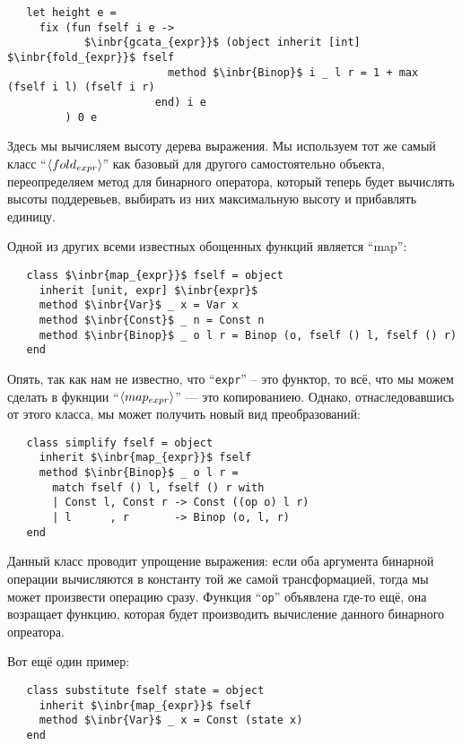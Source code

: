 \begin{lstlisting}
   let height e =
     fix (fun fself i e ->
            $\inbr{gcata_{expr}}$ (object inherit [int] $\inbr{fold_{expr}}$ fself
                         method $\inbr{Binop}$ i _ l r = 1 + max (fself i l) (fself i r) 
                       end) i e
         ) 0 e
\end{lstlisting}

Здесь мы вычисляем высоту дерева выражения. Мы используем тот же самый класс ``$\left<fold_{expr}\right>$'' как базовый для другого самостоятельно объекта, переопределяем метод для бинарного оператора, который теперь будет вычислять высоты поддеревьев, выбирать из них максимальную высоту и прибавлять единицу.

Одной из других всеми известных обощенных функций является ``map'':

\begin{lstlisting}
   class $\inbr{map_{expr}}$ fself = object 
     inherit [unit, expr] $\inbr{expr}$
     method $\inbr{Var}$ _ x = Var x
     method $\inbr{Const}$ _ n = Const n
     method $\inbr{Binop}$ _ o l r = Binop (o, fself () l, fself () r)
   end
\end{lstlisting}

Опять, так как нам не известно, что ``\lstinline{expr}'' -- это функтор, то всё, что мы можем сделать в фукнции ``$\left<map_{expr}\right>$'' --- 
это копированиею. Однако, отнаследовавшись от этого класса, мы может получить новый вид преобразований:

\begin{lstlisting}
   class simplify fself = object 
     inherit $\inbr{map_{expr}}$ fself
     method $\inbr{Binop}$ _ o l r =
       match fself () l, fself () r with
       | Const l, Const r -> Const ((op o) l r)
       | l      , r       -> Binop (o, l, r)     
   end
\end{lstlisting}

Данный класс проводит упрощение выражения: если оба аргумента бинарной операции вычисляются в константу той же самой трансформацией, тогда 
мы может произвести операцию сразу. Функция ``\lstinline{op}'' объявлена где-то ещё, она возращает функцию, которая будет производить вычисление данного бинарного опреатора.

Вот ещё один пример:

\begin{lstlisting}
   class substitute fself state = object 
     inherit $\inbr{map_{expr}}$ fself
     method $\inbr{Var}$ _ x = Const (state x)  
   end
\end{lstlisting}

